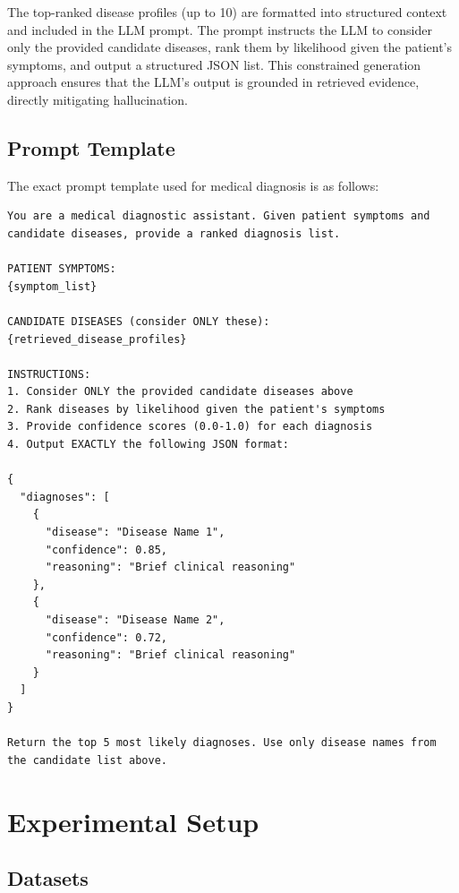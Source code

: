\documentclass[preprint,12pt]{elsarticle}
\begin{document}
The top-ranked disease profiles (up to 10) are formatted into structured context and included in the LLM prompt. The prompt instructs the LLM to consider only the provided candidate diseases, rank them by likelihood given the patient's symptoms, and output a structured JSON list. This constrained generation approach ensures that the LLM's output is grounded in retrieved evidence, directly mitigating hallucination.

\subsection{Prompt Template}
\label{sec:prompt_template}

The exact prompt template used for medical diagnosis is as follows:

\begin{lstlisting}[basicstyle=\footnotesize\ttfamily, breaklines=true, frame=single]
You are a medical diagnostic assistant. Given patient symptoms and candidate diseases, provide a ranked diagnosis list.

PATIENT SYMPTOMS:
{symptom_list}

CANDIDATE DISEASES (consider ONLY these):
{retrieved_disease_profiles}

INSTRUCTIONS:
1. Consider ONLY the provided candidate diseases above
2. Rank diseases by likelihood given the patient's symptoms
3. Provide confidence scores (0.0-1.0) for each diagnosis
4. Output EXACTLY the following JSON format:

{
  "diagnoses": [
    {
      "disease": "Disease Name 1",
      "confidence": 0.85,
      "reasoning": "Brief clinical reasoning"
    },
    {
      "disease": "Disease Name 2", 
      "confidence": 0.72,
      "reasoning": "Brief clinical reasoning"
    }
  ]
}

Return the top 5 most likely diagnoses. Use only disease names from the candidate list above.
\end{lstlisting}

\section{Experimental Setup}
\label{sec:experiments}

\subsection{Datasets}
\end{document}
